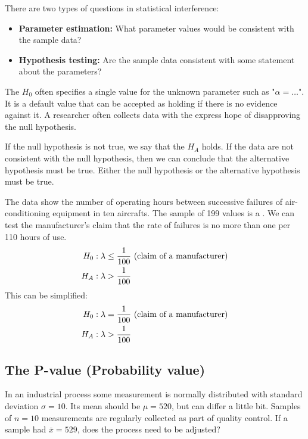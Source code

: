 There are two types of questions in statistical interference:
\begin{itemize}
    \item \textbf{Parameter estimation:} What parameter values would be consistent with the sample data?
    \item \textbf{Hypothesis testing:} Are the sample data consistent with some statement about the parameters?
\end{itemize}

The  $H_0$ often specifies a single value for the unknown parameter such as "$\alpha = \dots$". It is a default value that can be accepted as holding if there is no evidence against it. A researcher often collects data with the express hope of disapproving the null hypothesis.

If the null hypothesis is not true, we say that the  $H_A$ holds. If the data are not consistent with the null hypothesis, then we can conclude that the alternative hypothesis must be true. Either the null hypothesis or the alternative hypothesis must be true.

\begin{example}
    The data show the number of operating hours between successive failures of air-conditioning equipment in ten aircrafts. The sample of 199 values is a . We can test the manufacturer's claim that the rate of failures is no more than one per 110 hours of use.
    \begin{align}
        H_0: \lambda &\le \frac{1}{100}\text{ (claim of a manufacturer)} \notag \\
        H_A: \lambda &> \frac{1}{100} \notag
    \end{align}
    This can be simplified: \\
    \begin{align}
        H_0: \lambda &= \frac{1}{100}\text{ (claim of a manufacturer)} \notag \\
        H_A: \lambda &> \frac{1}{100} \notag
    \end{align}
\end{example}

\subsection{The P-value (Probability value)}

In an industrial process some measurement is normally distributed with standard deviation $\sigma = 10$. Its mean should be $\mu = 520$, but can differ a little bit. Samples of $n=10$ measurements are regularly collected as part of quality control. If a sample had $\bar{x}=529$, does the process need to be adjusted?

